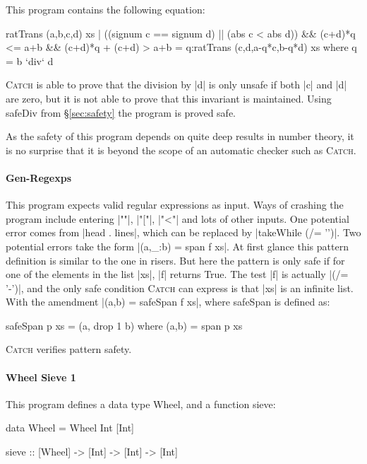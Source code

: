 \documentclass[preprint]{sigplanconf}
\newcommand{\C}[1]{\textsf{#1}}
\newcommand{\catch}{\textsc{Catch}}
\newcommand{\ignore}{}
\begin{document}
This program contains the following equation:

\begin{code}
ratTrans (a,b,c,d) xs |
  ((signum c == signum d) || (abs c < abs d)) &&
  (c+d)*q <= a+b && (c+d)*q + (c+d) > a+b
     = q:ratTrans (c,d,a-q*c,b-q*d) xs
  where q = b `div` d
\end{code}

\noindent \catch{} is able to prove that the division by |d| is only unsafe if both |c| and |d| are zero, but it is not able to prove that this invariant is maintained. Using \C{safeDiv} from \S\ref{sec:safety} the program is proved safe.

As the safety of this program depends on quite deep results in number theory, it is no surprise that it is beyond the scope of an automatic checker such as \catch{}.

\paragraph{Gen-Regexps}

This program expects valid regular expressions as input. Ways of crashing the program include entering |""|, |"["|, |"<"| and lots of other inputs. One potential error comes from |head . lines|, which can be replaced by |takeWhile (/= '\n')|. Two potential errors take the form \ignore|(a,_:b) = span f xs|. At first glance this pattern definition is similar to the one in \C{risers}. But here the pattern is only safe if for one of the elements in the list |xs|, |f| returns True. The test |f| is actually |(/= '-')|, and the only safe condition \catch{} can express is that |xs| is an infinite list. With the amendment  \ignore|(a,b) = safeSpan f xs|, where \C{safeSpan} is defined as:

\begin{code}
safeSpan p xs = (a, drop 1 b) where (a,b) = span p xs
\end{code}

\noindent \catch{} verifies pattern safety.

\paragraph{Wheel Sieve 1}

This program defines a data type \C{Wheel}, and a function \C{sieve}:

\begin{code}
data Wheel = Wheel Int [Int]

sieve :: [Wheel] -> [Int] -> [Int] -> [Int]
\end{code}
\end{document}
